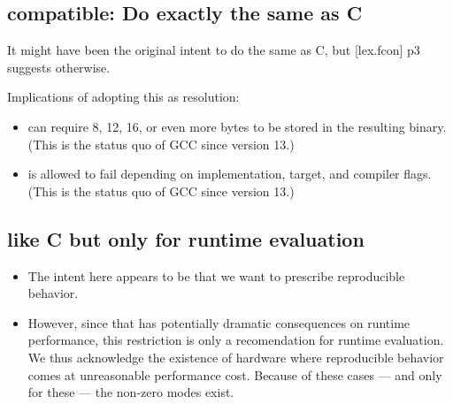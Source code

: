 \subsection{compatible: Do exactly the same as C}\label{d:2}

It might have been the original intent to do the same as C, but [lex.fcon] p3
suggests otherwise.

Implications of adopting this as resolution:
\begin{itemize}
  \item {} can require 8, 12, 16, or even more bytes to be
    stored in the resulting binary.
    (This is the status quo of GCC since version 13.)

  \item {} is allowed to fail
    depending on implementation, target, and compiler flags.
    (This is the status quo of GCC since version 13.)
\end{itemize}

\subsection{like C but only for runtime evaluation}\label{d:3}

\begin{itemize}
  \item The intent here appears to be that we want to prescribe reproducible
    \fp behavior.

  \item However, since that has potentially dramatic consequences on runtime
    performance, this restriction is only a recomendation for runtime
    evaluation.
    We thus acknowledge the existence of hardware where reproducible \fp
    behavior comes at unreasonable performance cost.
    Because of these cases --- and only for these --- the non-zero
     modes exist.
\end{itemize}
